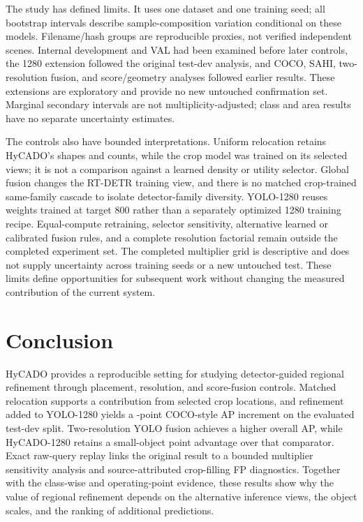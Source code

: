 \documentclass[journal]{IEEEtran}
\begin{document}
The study has defined limits. It uses one dataset and one training seed; all bootstrap intervals describe sample-composition variation conditional on these models. Filename/hash groups are reproducible proxies, not verified independent scenes. Internal development and VAL had been examined before later controls, the 1280 extension followed the original test-dev analysis, and COCO, SAHI, two-resolution fusion, and score/geometry analyses followed earlier results. These extensions are exploratory and provide no new untouched confirmation set. Marginal secondary intervals are not multiplicity-adjusted; class and area results have no separate uncertainty estimates.

The controls also have bounded interpretations. Uniform relocation retains HyCADO's shapes and counts, while the crop model was trained on its selected views; it is not a comparison against a learned density or utility selector. Global fusion changes the RT-DETR training view, and there is no matched crop-trained same-family cascade to isolate detector-family diversity. YOLO-1280 reuses weights trained at target 800 rather than a separately optimized 1280 training recipe. Equal-compute retraining, selector sensitivity, alternative learned or calibrated fusion rules, and a complete resolution factorial remain outside the completed experiment set. The completed multiplier grid is descriptive and does not supply uncertainty across training seeds or a new untouched test. These limits define opportunities for subsequent work without changing the measured contribution of the current system.

\section{Conclusion}
HyCADO provides a reproducible setting for studying detector-guided regional refinement through placement, resolution, and score-fusion controls. Matched relocation supports a contribution from selected crop locations, and refinement added to YOLO-1280 yields a \CocoHY-point COCO-style AP increment on the evaluated test-dev split. Two-resolution YOLO fusion achieves a higher overall AP, while HyCADO-1280 retains a small-object point advantage over that comparator. Exact raw-query replay links the original result to a bounded multiplier sensitivity analysis and source-attributed crop-filling FP diagnostics. Together with the class-wise and operating-point evidence, these results show why the value of regional refinement depends on the alternative inference views, the object scales, and the ranking of additional predictions.
\end{document}
